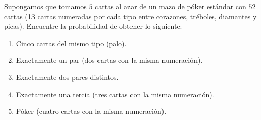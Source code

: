 \documentclass[12pt,a4paper]{article}
\begin{document}
    \begin{mdframed}[style=mdbluebox,frametitle={Ejercicio 4}]
        Supongamos que tomamos $5$ cartas al azar de un mazo de póker estándar con $52$ cartas 
        (13 cartas numeradas por cada tipo entre corazones, tréboles, diamantes y picas). 
        Encuentre la probabilidad de obtener lo siguiente:
        \begin{enumerate}
            \item[(a)] Cinco cartas del mismo tipo (palo).
            \item[(b)] Exactamente un par (dos cartas con la misma numeración).
            \item[(c)] Exactamente dos pares distintos.
            \item[(d)] Exactamente una tercia (tres cartas con la misma numeración).
            \item[(e)] Póker (cuatro cartas con la misma numeración).
        \end{enumerate}
    \end{mdframed}
\end{document}
